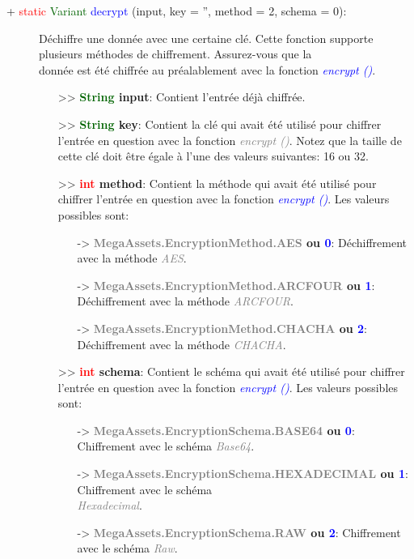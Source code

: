 \documentclass[a4paper, 11pt]{article}
\begin{document}
	\newpage \begin{description}
		\item [+ \textcolor{red}{static} \textcolor{darkgreen}{Variant} \textcolor{blue}{decrypt} (input, 
		key = '', method = 2, schema = 0):] Déchiffre une donnée avec une certaine clé. Cette fonction 
		supporte plusieurs méthodes de chiffrement. Assurez-vous que la \\donnée est été chiffrée au 
		préalablement avec la fonction \textcolor {blue}{\textit{encrypt ()}}.
		\begin{itemize}
			\item [>> \textbf{\textcolor{darkgreen}{String} input}:] Contient l'entrée déjà chiffrée.
			\item [>> \textbf{\textcolor{darkgreen}{String} key}:] Contient la clé qui avait été utilisé 
			pour chiffrer l'entrée en question avec la fonction \textit {\textcolor{gray}{encrypt ()}}.
			Notez que la taille de cette clé doit être égale à l'une des valeurs suivantes: 16 ou 32.
			\item [>> \textbf{\textcolor{red}{int} method}:] Contient la méthode qui avait été utilisé pour
			chiffrer l'entrée en question avec la fonction \textit{\textcolor{blue}{encrypt ()}}. Les
			valeurs possibles sont:
			\begin{itemize}
				\item [-> \textbf{\textcolor{gray}{MegaAssets.EncryptionMethod.AES} ou \textcolor{blue}
				{0}}:] Déchiffrement avec la méthode \textit{\textcolor{gray}{AES}}.
				\item [-> \textbf{\textcolor{gray}{MegaAssets.EncryptionMethod.ARCFOUR} ou \textcolor{blue}
				{1}}:] Déchiffrement avec la méthode \textit{\textcolor{gray}{ARCFOUR}}.
				\item [-> \textbf{\textcolor{gray}{MegaAssets.EncryptionMethod.CHACHA} ou \textcolor{blue}
				{2}}:] Déchiffrement avec la méthode \textit{\textcolor{gray}{CHACHA}}.
			\end{itemize}
			\item [>> \textbf{\textcolor{red}{int} schema}:] Contient le schéma qui avait été utilisé 
			pour chiffrer l'entrée en question avec la fonction \textit{\textcolor{blue}{encrypt ()}}. Les 
			valeurs possibles sont:
			\begin{itemize}
				\item [-> \textbf{\textcolor{gray}{MegaAssets.EncryptionSchema.BASE64} ou \textcolor{blue}
				{0}}:] Chiffrement avec le schéma \textit{\textcolor{gray}{Base64}}.
				\item [-> \textbf{\textcolor{gray}{MegaAssets.EncryptionSchema.HEXADECIMAL} ou 
				\textcolor{blue}{1}}:] Chiffrement avec le schéma \textit{\textcolor{gray}{\\Hexadecimal}}.
				\item [-> \textbf{\textcolor{gray}{MegaAssets.EncryptionSchema.RAW} ou \textcolor{blue}
				{2}}:] Chiffrement avec le schéma \textit{\textcolor{gray}{Raw}}.\\
			\end{itemize}
		\end{itemize}
	\end{description}
\end{document}
